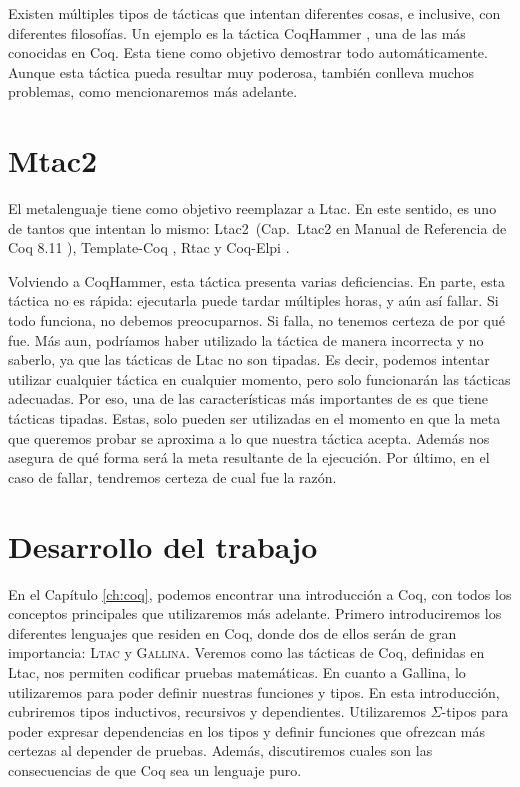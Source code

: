 Existen múltiples tipos de tácticas que intentan diferentes cosas, e inclusive, con diferentes filosofías.
Un ejemplo es la táctica CoqHammer \cite{DBLP:journals/jar/CzajkaK18}, una de las más conocidas en Coq. Esta tiene como objetivo demostrar todo automáticamente.
Aunque esta táctica pueda resultar muy poderosa, también conlleva muchos problemas, como mencionaremos más adelante.

\section{Mtac2}

El metalenguaje \Mtac \cite{DBLP:journals/pacmpl/KaiserZKRD18} tiene como objetivo reemplazar a Ltac.
En este sentido, es uno de tantos que intentan lo mismo: Ltac2~(Cap.~Ltac2 en Manual de Referencia de Coq 8.11 \cite{Coq}), Template-Coq \cite{DBLP:conf/itp/AnandBCST18}, Rtac \cite{DBLP:conf/esop/MalechaB16} y Coq-Elpi \cite{tassi:hal-01637063}.

Volviendo a CoqHammer, esta táctica presenta varias deficiencias.
En parte, esta táctica no es rápida: ejecutarla puede tardar múltiples horas, y aún así fallar.
Si todo funciona, no debemos preocuparnos.
Si falla, no tenemos certeza de por qué fue.
Más aun, podríamos haber utilizado la táctica de manera incorrecta y no saberlo, ya que las tácticas de Ltac no son tipadas.
Es decir, podemos intentar utilizar cualquier táctica en cualquier momento, pero solo funcionarán las tácticas adecuadas.
Por eso, una de las características más importantes de \mtac es que tiene tácticas tipadas.
Estas, solo pueden ser utilizadas en el momento en que la meta que queremos probar se aproxima a lo que nuestra táctica acepta.
Además nos asegura de qué forma será la meta resultante de la ejecución.
Por último, en el caso de fallar, tendremos certeza de cual fue la razón.


\section{Desarrollo del trabajo}

En el Capítulo \ref{ch:coq}, podemos encontrar una introducción a Coq, con todos los conceptos principales que utilizaremos más adelante.
Primero introduciremos los diferentes lenguajes que residen en Coq, donde dos de ellos serán de gran importancia: \textsc{Ltac} y \textsc{Gallina}.
Veremos como las tácticas de Coq, definidas en Ltac, nos permiten codificar pruebas matemáticas.
En cuanto a Gallina, lo utilizaremos para poder definir nuestras funciones y tipos.
En esta introducción, cubriremos tipos inductivos, recursivos y dependientes.
Utilizaremos $\Sigma$-tipos para poder expresar dependencias en los tipos y definir funciones que ofrezcan más certezas al depender de pruebas.
Además, discutiremos cuales son las consecuencias de que Coq sea un lenguaje puro.

